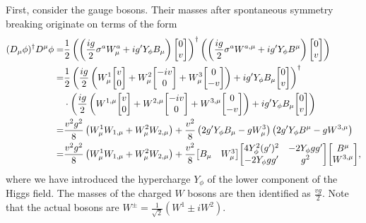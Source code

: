 First, consider the gauge bosons. Their masses after spontaneous symmetry breaking originate on terms of the form
\begin{align*}
	(D_{\mu}\phi)\adj D^{\mu}\phi =& \frac{1}{2}\left(\left(\frac{ig}{2}\sigma^{a}W^{a}_{\mu} + ig\p Y_{\phi}B_{\mu}\right)\mqty[
		0 \\
		v
	]\right)\adj\left(\left(\frac{ig}{2}\sigma^{a}W^{a, \mu} + ig\p Y_{\phi}B^{\mu}\right)\mqty[
		0 \\
		v
	]\right) \\
	=& \frac{1}{2}\left(\frac{ig}{2}\left(W^{1}_{\mu}\mqty[
		v \\
		0
	] + W^{2}_{\mu}\mqty[
		-iv \\
		0
	] + W^{3}_{\mu}\mqty[
		0 \\
		-v
	]\right) + ig\p Y_{\phi}B_{\mu}\mqty[
	0 \\
	v
	]\right)\adj\\
	 &\cdot\left(\frac{ig}{2}\left(W^{1, \mu}\mqty[
		v \\
		0
	] + W^{2, \mu}\mqty[
		-iv \\
		0
	] + W^{3, \mu}\mqty[
		0 \\
		-v
	]\right) + ig\p Y_{\phi}B_{\mu}\mqty[
		0 \\
		v
	]\right) \\
	=& \frac{v^{2}g^{2}}{8}\left(W_{\mu}^{1}W_{1, \mu} + W_{\mu}^{2}W_{2, \mu}\right) + \frac{v^{2}}{8}\left(2g\p Y_{\phi}B_{\mu} - gW^{3}_{\mu}\right)\left(2g\p Y_{\phi}B^{\mu} - gW^{3, \mu}\right) \\
	=& \frac{v^{2}g^{2}}{8}\left(W_{\mu}^{1}W_{1, \mu} + W_{\mu}^{2}W_{2, \mu}\right) + \frac{v^{2}}{8}\mqty[
		B_{\mu} & W^{3}_{\mu}
	]\mqty[
		4Y_{\phi}^{2}(g\p)^{2} & -2Y_{\phi}gg\p \\
		-2Y_{\phi}gg\p         & g^{2}
	]\mqty[
		B^{\mu} \\
		W^{3, \mu}
	],
\end{align*}
where we have introduced the hypercharge $Y_{\phi}$ of the lower component of the Higgs field. The masses of the charged $W$ bosons are then identified as $\frac{vg}{2}$. Note that the actual bosons are $W^{\pm} = \frac{1}{\sqrt{2}}(W^{1} \pm iW^{2})$.

